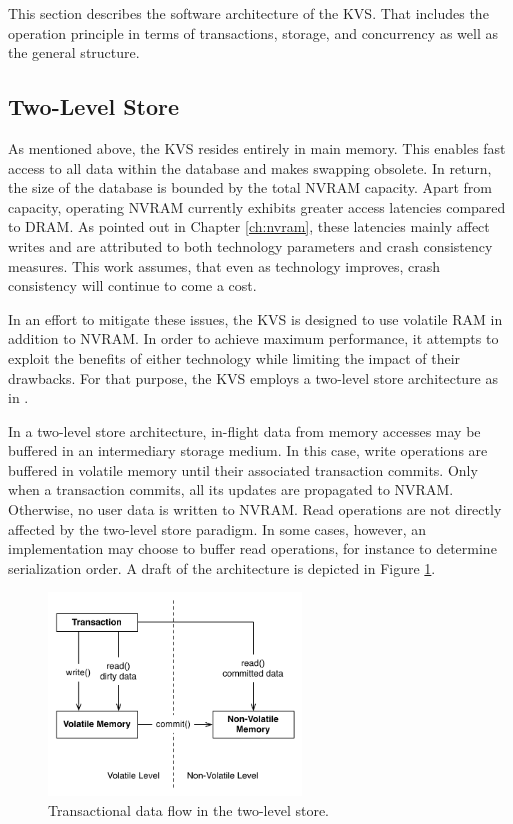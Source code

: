 This section describes the software architecture of the \ac{KVS}. That includes
the operation principle in terms of transactions, storage, and concurrency as
well as the general structure.

\subsection{Two-Level Store}

As mentioned above, the \ac{KVS} resides entirely in main memory. This enables
fast access to all data within the database and makes swapping obsolete. In
return, the size of the database is bounded by the total \ac{NVRAM} capacity.
Apart from capacity, operating \ac{NVRAM} currently exhibits greater access
latencies compared to \ac{DRAM}. As pointed out in Chapter \ref{ch:nvram}, these
latencies mainly affect writes and are attributed to both technology parameters
and crash consistency measures. This work assumes, that even as technology
improves, crash consistency will continue to come a cost.

In an effort to mitigate these issues, the \ac{KVS} is designed to use volatile
\ac{RAM} in addition to \ac{NVRAM}. In order to achieve maximum performance, it
attempts to exploit the benefits of either technology while limiting the impact
of their drawbacks. For that purpose, the \ac{KVS} employs a two-level store
architecture as in \cite{bailey2013exploring}.

In a two-level store architecture, in-flight data from memory accesses may be
buffered in an intermediary storage medium. In this case, write operations are
buffered in volatile memory until their associated transaction commits. Only
when a transaction commits, all its updates are propagated to \ac{NVRAM}.
Otherwise, no user data is written to \ac{NVRAM}. Read operations are not
directly affected by the two-level store paradigm. In some cases, however, an
implementation may choose to buffer read operations, for instance to determine
serialization order. A draft of the architecture is depicted in Figure
\ref{fig:concept-two-level-store}.

\begin{figure}[h!]
    \centering
    \includegraphics[width=0.6\textwidth]{figures/concept/two-level-store.pdf}
    \caption{Transactional data flow in the two-level store.}
    \label{fig:concept-two-level-store}
\end{figure}

